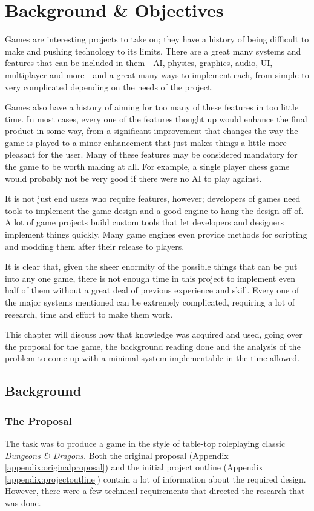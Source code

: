 \chapter{Background \& Objectives}

Games are interesting projects to take on; they have a history of being difficult to make and pushing technology to its limits. There are a great many systems and features that can be included in them---AI, physics, graphics, audio, UI, multiplayer and more---and a great many ways to implement each, from simple to very complicated depending on the needs of the project.

Games also have a history of aiming for too many of these features in too little time. In most cases, every one of the features thought up would enhance the final product in some way, from a significant improvement that changes the way the game is played to a minor enhancement that just makes things a little more pleasant for the user. Many of these features may be considered mandatory for the game to be worth making at all. For example, a single player chess game would probably not be very good if there were no AI to play against.

It is not just end users who require features, however; developers of games need tools to implement the game design and a good engine to hang the design off of. A lot of game projects build custom tools that let developers and designers implement things quickly. Many game engines even provide methods for scripting and modding them after their release to players.

It is clear that, given the sheer enormity of the possible things that can be put into any one game, there is not enough time in this project to implement even half of them without a great deal of previous experience and skill. Every one of the major systems mentioned can be extremely complicated, requiring a lot of research, time and effort to make them work.

This chapter will discuss how that knowledge was acquired and used, going over the proposal for the game, the background reading done and the analysis of the problem to come up with a minimal system implementable in the time allowed.

\section{Background}

\subsection{The Proposal}
The task was to produce a game in the style of table-top roleplaying classic \textit{Dungeons \& Dragons.} Both the original proposal (Appendix \ref{appendix:originalproposal}) and the initial project outline (Appendix \ref{appendix:projectoutline}) contain a lot of information about the required design. However, there were a few technical requirements that directed the research that was done.


